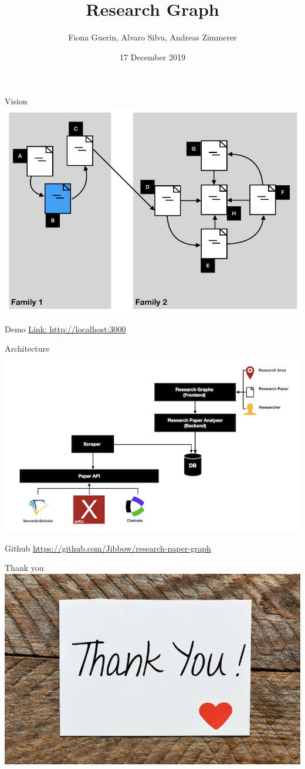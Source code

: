 \documentclass{beamer}
\title[Research Graph]{Research Graph}
\author[Guerin, Silva, Zimmerer]{Fiona Guerin, Alvaro Silva, Andreas Zimmerer}
\institute{Technical University of Munich}
\date{17 December 2019}
\begin{document}
\maketitle

\begin{frame}{Vision}
    \includegraphics{img_02.png}
\end{frame}

\begin{frame}{Demo}
\url{Link: http://localhost:3000}
\end{frame}

\begin{frame}{Architecture}
    \includegraphics{img_03.png}
\end{frame}

\begin{frame}{Github}
    \url{https://github.com/Jibbow/research-paper-graph}
\end{frame}

\begin{frame}{Thank you}
    \includegraphics{img_05.png}
\end{frame}
\end{document}
